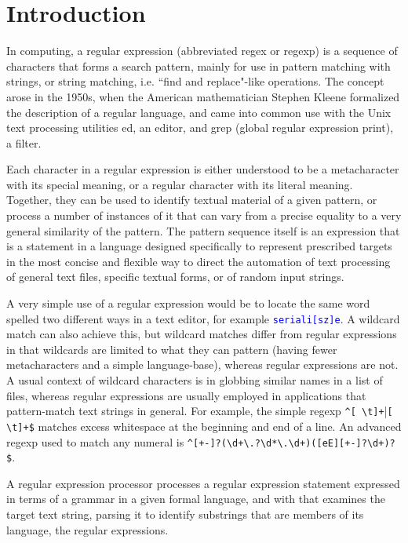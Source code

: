 \part{Introduction}




In computing, a regular expression (abbreviated regex or regexp) is a sequence of characters that forms a search pattern, mainly for use in pattern matching with strings, or string matching, i.e. ``find and replace"-like operations. The concept arose in the 1950s, when the American mathematician Stephen Kleene formalized the description of a regular language, and came into common use with the Unix text processing utilities ed, an editor, and grep (global regular expression print), a filter.

Each character in a regular expression is either understood to be a metacharacter with its special meaning, or a regular character with its literal meaning. Together, they can be used to identify textual material of a given pattern, or process a number of instances of it that can vary from a precise equality to a very general similarity of the pattern. The pattern sequence itself is an expression that is a statement in a language designed specifically to represent prescribed targets in the most concise and flexible way to direct the automation of text processing of general text files, specific textual forms, or of random input strings.

A very simple use of a regular expression would be to locate the same word spelled two different ways in a text editor, for example \textcolor{Blue}{\texttt{seriali[sz]e}}. A wildcard match can also achieve this, but wildcard matches differ from regular expressions in that wildcards are limited to what they can pattern (having fewer metacharacters and a simple language-base), whereas regular expressions are not. A usual context of wildcard characters is in globbing similar names in a list of files, whereas regular expressions are usually employed in applications that pattern-match text strings in general. For example, the simple regexp \verb|^[ \t]+||\verb|[ \t]+$| matches excess whitespace at the beginning and end of a line. An advanced regexp used to match any numeral is \verb|^[+-]?(\d+\.?\d*|\verb|\.\d+)([eE][+-]?\d+)?$|.


A regular expression processor processes a regular expression statement expressed in terms of a grammar in a given formal language, and with that examines the target text string, parsing it to identify substrings that are members of its language, the regular expressions.

